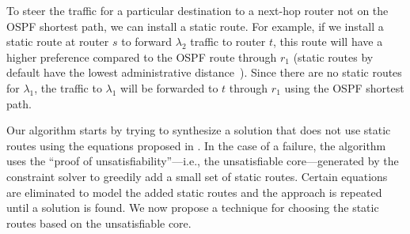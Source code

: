 To steer the traffic for a particular destination
to a next-hop router not on the OSPF shortest path, we can 
install a static route. For example, if we install
a static route at router $s$ to forward $\lambda_2$ 
traffic to router $t$, this route will have a higher
preference compared to the OSPF route
through $r_1$ (static routes by default have the
lowest administrative distance~\cite{admindistance}). 
Since there are no static routes for
$\lambda_1$, the traffic to $\lambda_1$ will be forwarded to $t$
through $r_1$ using the OSPF shortest path.




Our algorithm starts by trying to synthesize a solution
that does not use static routes using the equations proposed in . 
In the case of a failure, the algorithm uses the ``proof of unsatisfiability''---i.e., the unsatisfiable core---generated by 
the constraint solver 
to greedily add a small set of static routes. 
Certain equations are eliminated 
to model the added static routes 
and the approach is repeated until a solution is found.
We now propose a
technique for choosing the static routes based 
on the unsatisfiable core. 



